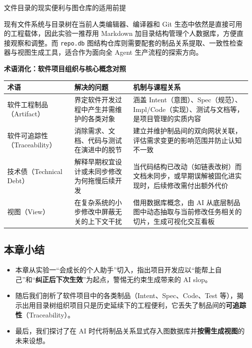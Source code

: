 \documentclass[UTF8,a4paper,11pt,fontset=fandol]{ctexart}
\begin{document}
\begin{warningbox}{文件目录的现实便利与图仓库的适用前提}

现有文件系统与目录树在当前人类编辑器、编译器和 Git 生态中依然是直接可用的工程载体，因此实验一推荐用 Markdown 加目录结构管理个人数据库，方便直接观察和调整。而 \texttt{repo.db} 图结构仓库则需要配套的制品关系提取、一致性检查器与视图生成工具，适合作为面向全 Agent 生产流程的探索方向。

\end{warningbox}

\par{}\textbf{术语消化：软件项目组织与核心概念对照}

\begin{center}\small\begin{tabularx}{\linewidth}{YYY}

\toprule

术语 & 解决的问题 & 机制与课程关系\\\midrule

软件工程制品（Artifact） & 界定软件开发过程中产生并需维护的各类对象 & 涵盖 Intent（意图）、Spec（规范）、Impl/Code（实现）、测试与文档等，是项目管理的实质内容\\[3pt]

软件可追踪性（Traceability） & 消除需求、文档、代码与测试在演进中的脱节 & 建立并维护制品间的双向网状关联，评估需求变更的影响范围并防止认知不一致\\[3pt]

技术债（Technical Debt） & 解释早期权宜设计或未同步修改为何拖慢后续开发 & 当代码结构已改动（如链表改树）而文档未同步，或早期误解被固化进实现时，后续修改需付出额外代价\\[3pt]

视图（View） & 在复杂系统的小步修改中屏蔽无关的上下文干扰 & 借用数据库概念，由 AI 从底层制品图中动态抽取与当前修改任务相关的切片，生成可视化交互看板\\[3pt]

\bottomrule\end{tabularx}\end{center}

\subsection{本章小结}

\begin{itemize}
\item 本章从实验一“会成长的个人助手”切入，指出项目开发应以“能帮上自己”和“\textbf{纠正后下次生效}”为起点，警惕无约束生成带来的 AI slop。

\item 随后我们剖析了软件项目中的各类制品（Intent、Spec、Code、Test 等），揭示出用目录树组织项目只是历史延续下的工程便利，它丢失了制品间的\textbf{可追踪性}（Traceability）。

\item 最后，我们探讨了在 AI 时代将制品关系显式存入图数据库并\textbf{按需生成视图}的未来设想。
\end{itemize}
\end{document}

